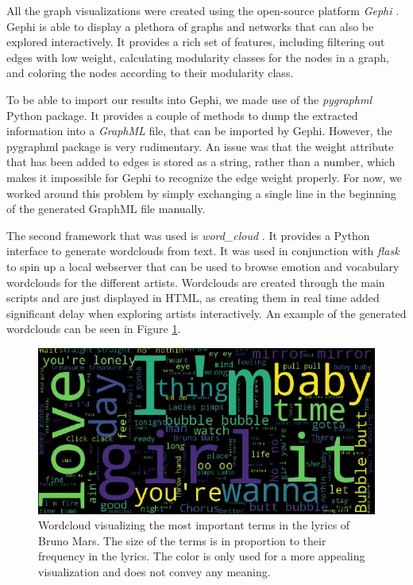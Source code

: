 \documentclass[10pt,a4paper]{article}
\begin{document}
	All the graph visualizations were created using the open-source platform \textit{Gephi} \cite{ICWSM09154}. Gephi is able to display a plethora of graphs and networks that can also be explored interactively. It provides a rich set of features, including filtering out edges with low weight, calculating modularity classes for the nodes in a graph, and coloring the nodes according to their modularity class. 
	
	To be able to import our results into Gephi, we made use of the \textit{pygraphml} Python package. It provides a couple of methods to dump the extracted information into a \textit{GraphML} file, that can be imported by Gephi. However, the pygraphml package is very rudimentary. An issue was that the weight attribute that has been added to edges is stored as a string, rather than a number, which makes it impossible for Gephi to recognize the edge weight properly. For now, we worked around this problem by simply exchanging a single line in the beginning of the generated GraphML file manually.
	
	The second framework that was used is \textit{word\_cloud} \cite{wordcloud}. It provides a Python interface to generate wordclouds from text. It was used in conjunction with \textit{flask} \cite{flask} to spin up a local webserver that can be used to browse emotion and vocabulary wordclouds for the different artists. Wordclouds are created through the main scripts and are just displayed in HTML, as creating them in real time added significant delay when exploring artists interactively. An example of the generated wordclouds can be seen in Figure \ref{fig:wordcloud}.
	
	\begin{figure}[htb]
		\centering
		\includegraphics[width=\linewidth]{data/wordcloud}
		\caption{Wordcloud visualizing the most important terms in the lyrics of Bruno Mars. The size of the terms is in proportion to their frequency in the lyrics. The color is only used for a more appealing visualization and does not convey any meaning.}
		\label{fig:wordcloud}
	\end{figure}
	
\end{document}
